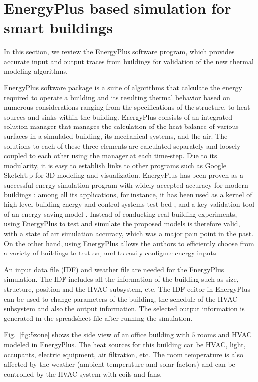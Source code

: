 \section{EnergyPlus based simulation for smart buildings}
\label{sec:energy_plus_review}
In this section, we review the EnergyPlus software program, which provides
accurate input and output traces from buildings for validation of the new
thermal modeling algorithms.

EnergyPlus software package is a suite of algorithms that calculate the
energy required to operate a building and its resulting thermal behavior based
on numerous considerations ranging from the specifications of the structure, to
heat sources and sinks within the building. EnergyPlus consists of
an integrated solution manager that manages the calculation of the heat balance
of various surfaces in a simulated building, its mechanical systems, and the air.
The solutions to each of these three elements
are calculated separately and loosely coupled to each other using the manager at
each time-step. Due to its modularity, it is easy to establish links to other
programs such as Google SketchUp for 3D modeling and visualization.
EnergyPlus has been proven as a successful energy
simulation program with widely-accepted accuracy for modern buildings
\cite{yang2016review}: among all its applications, for instance, it has been
used as a kernel of high level building energy and control systems test bed
\cite{wetter2011co}, and a key validation tool of an energy saving model
\cite{mardaljevic2009daylight}. Instead of conducting real building
experiments, using EnergyPlus to test and simulate the proposed models is
therefore valid, with a state of art simulation accuracy, which was a major
pain point in the past. On the other hand, using EnergyPlus allows the authors
to efficiently choose from a variety of buildings to test on, and to easily
configure energy inputs.

An input data file (IDF) and weather file are needed for the EnergyPlus
simulation. The IDF includes all the information of the building such
as size, structure, position and the HVAC subsystem, etc. The IDF
editor in EnergyPlus can be used to change parameters of the building, the
schedule of the HVAC subsystem and also the output information. The
selected output information is generated in the spreadsheet file
after running the simulation.

Fig.~\ref{fig:5zone} shows the side view of an office building
with 5 rooms and HVAC modeled in EnergyPlus. The heat sources for this building
can be HVAC, light, occupants, electric equipment, air filtration, etc. The
room temperature is also affected by the weather (ambient temperature and solar
factors) and can be controlled by the HVAC system with coils
and fans.

